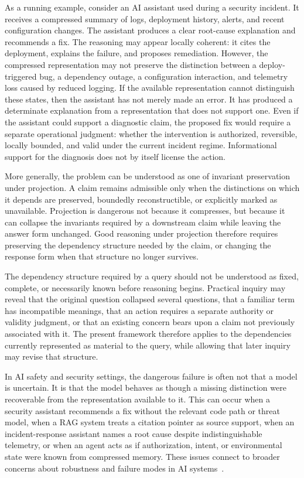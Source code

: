\documentclass[11pt]{article}
\begin{document}
As a running example, consider an AI assistant used during a security incident. It receives a compressed summary of logs, deployment history, alerts, and recent configuration changes. The assistant produces a clear root-cause explanation and recommends a fix. The reasoning may appear locally coherent: it cites the deployment, explains the failure, and proposes remediation. However, the compressed representation may not preserve the distinction between a deploy-triggered bug, a dependency outage, a configuration interaction, and telemetry loss caused by reduced logging. If the available representation cannot distinguish these states, then the assistant has not merely made an error. It has produced a determinate explanation from a representation that does not support one. Even if the assistant could support a diagnostic claim, the proposed fix would require a separate operational judgment: whether the intervention is authorized, reversible, locally bounded, and valid under the current incident regime. Informational support for the diagnosis does not by itself license the action.

More generally, the problem can be understood as one of invariant preservation under projection. A claim remains admissible only when the distinctions on which it depends are preserved, boundedly reconstructible, or explicitly marked as unavailable. Projection is dangerous not because it compresses, but because it can collapse the invariants required by a downstream claim while leaving the answer form unchanged. Good reasoning under projection therefore requires preserving the dependency structure needed by the claim, or changing the response form when that structure no longer survives.

The dependency structure required by a query should not be understood as fixed, complete, or necessarily known before reasoning begins. Practical inquiry may reveal that the original question collapsed several questions, that a familiar term has incompatible meanings, that an action requires a separate authority or validity judgment, or that an existing concern bears upon a claim not previously associated with it. The present framework therefore applies to the dependencies currently represented as material to the query, while allowing that later inquiry may revise that structure.

In AI safety and security settings, the dangerous failure is often not that a model is uncertain. It is that the model behaves as though a missing distinction were recoverable from the representation available to it. This can occur when a security assistant recommends a fix without the relevant code path or threat model, when a RAG system treats a citation pointer as source support, when an incident-response assistant names a root cause despite indistinguishable telemetry, or when an agent acts as if authorization, intent, or environmental state were known from compressed memory. These issues connect to broader concerns about robustness and failure modes in AI systems~\cite{Amodei2016}.
\end{document}
